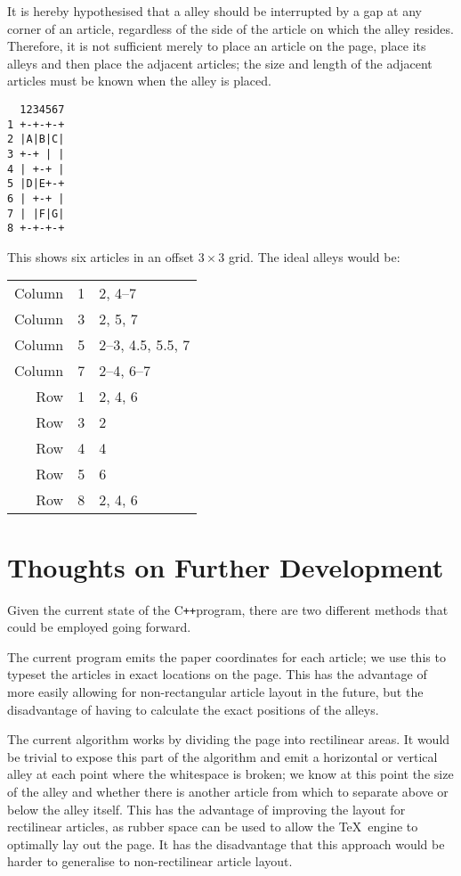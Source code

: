 \documentclass[a4paper]{scrartcl}
\newcommand{\cpp}{\mbox{C\texttt{++}}}
\begin{document}
It is hereby hypothesised that a alley should be interrupted by a gap
at any corner of an article, regardless of the side of the article on
which the alley resides. Therefore, it is not sufficient merely to
place an article on the page, place its alleys and then place the
adjacent articles; the size and length of the adjacent articles must
be known when the alley is placed.

\pagebreak[1]

\begin{verbatim}
  1234567
1 +-+-+-+
2 |A|B|C|
3 +-+ | |
4 | +-+ |
5 |D|E+-+
6 | +-+ |
7 | |F|G|
8 +-+-+-+
\end{verbatim}

This shows six articles in an offset $3\times 3$ grid.
The ideal alleys would be:

\begin{tabular}{r|c|l}
Column & 1 & 2, 4--7 \\
Column & 3 & 2, 5, 7 \\
Column & 5 & 2--3, 4.5, 5.5, 7 \\
Column & 7 & 2--4, 6--7 \\
Row & 1 & 2, 4, 6 \\
Row & 3 & 2 \\
Row & 4 & 4 \\
Row & 5 & 6 \\
Row & 8 & 2, 4, 6
\end{tabular}

\section*{Thoughts on Further Development}

Given the current state of the \cpp program, there are two different
methods that could be employed going forward.

The current program emits the paper coordinates for each article; we
use this to typeset the articles in exact locations on the page. This
has the advantage of more easily allowing for non-rectangular article
layout in the future, but the disadvantage of having to calculate the
exact positions of the alleys.

The current algorithm works by dividing the page into rectilinear
areas. It would be trivial to expose this part of the algorithm and
emit a horizontal or vertical alley at each point where the
whitespace is broken; we know at this point the size of the alley and
whether there is another article from which to separate above or below
the alley itself. This has the advantage of improving the layout for
rectilinear articles, as rubber space can be used to allow the
\TeX\ engine to optimally lay out the page. It has the disadvantage
that this approach would be harder to generalise to non-rectilinear
article layout.
\end{document}
